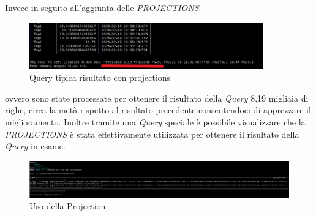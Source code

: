       Invece in seguito all'aggiunta delle \textit{PROJECTIONS}:
      \begin{figure}[H]
        \centering
        \includegraphics[width=0.9\textwidth]{../Images/SpecificaTecnica/ConProjectionRisultato.jpg}
        \caption{Query tipica risultato con projections}
        \label{fig:ProjectionsQueryWith}
      \end{figure}   
  ovvero sono state processate per ottenere il risultato della \textit{Query} 8,19 migliaia di righe, circa la metà rispetto al risultato precedente consentendoci di apprezzare il miglioramento.
Inoltre tramite una \textit{Query} speciale è possibile visualizzare che la \textit{PROJECTIONS} è stata effettivamente utilizzata per ottenere il risultato della \textit{Query} in esame.
\begin{figure}[H]
    \centering
    \includegraphics[width=1\textwidth]{../Images/SpecificaTecnica/ProjectionUsedByClickHouse.jpg}
    \caption{Uso della Projection}
    \label{fig:ProjectionsUsed}
  \end{figure}   